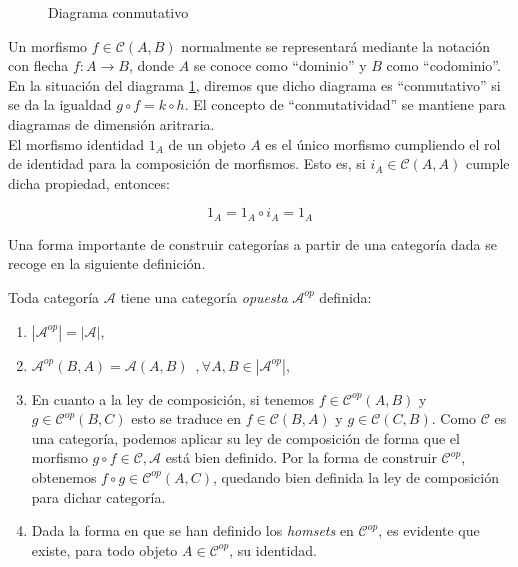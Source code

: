 \begin{figure}[htpb] %
    \centering
    \caption{Diagrama conmutativo}
    \label{diag:diagrama-basico}
\end{figure}

Un morfismo $f \in \mathscr{C}(A,B)$ normalmente se representará mediante la notación con flecha $f: A \longrightarrow B$, donde $A$ se conoce como ``dominio'' y $B$ como ``codominio''.
En la situación del diagrama \ref{diag:diagrama-basico}, diremos que dicho diagrama es ``conmutativo'' si se da la igualdad $g \circ f = k \circ h$. El concepto de ``conmutatividad'' se mantiene para diagramas de dimensión aritraria. \\
El morfismo identidad $1_{A}$ de un objeto $A$ es el único morfismo cumpliendo el rol de identidad para la composición de morfismos. Esto es, si $i_{A} \in \mathscr{C}(A,A)$ cumple dicha propiedad, entonces:

\begin{equation}
    1_{A} = 1_{A} \circ i_{A} = 1_{A}
\end{equation}

Una forma importante de construir categorías a partir de una categoría dada se recoge en la siguiente definición.

\begin{definicion} 
    Toda categoría $\mathscr{A}$ tiene una categoría \textit{opuesta} $\mathscr{A}^{op}$ definida:
    \begin{enumerate}
        \item $|\mathscr{A}^{op}| = |\mathscr{A}|$,
        \item $\mathscr{A}^{op}(B,A) = \mathscr{A}(A,B) \, \, \, , \forall A,B \in |\mathscr{A}^{op}|$,
        \item En cuanto a la ley de composición, si tenemos $f \in \mathscr{C}^{op}(A,B)$ y $g \in \mathscr{C}^{op}(B,C)$ esto se traduce en $f \in  \mathscr{C}(B,A)$ y $g \in \mathscr{C}(C,B)$. Como $\mathscr{C}$ es una categoría, podemos aplicar su ley de composición de forma que el morfismo $g \circ f \in \mathscr{C,A}$ está bien definido. Por la forma de construir $\mathscr{C}^{op}$, obtenemos $f \circ g \in \mathscr{C}^{op}(A,C)$, quedando bien definida la ley de composición para dichar categoría.
        \item Dada la forma en que se han definido los \textit{homsets} en $\mathscr{C}^{op}$, es evidente que existe, para todo objeto $A \in \mathscr{C}^{op}$, su identidad.
    \end{enumerate}
\end{definicion}

